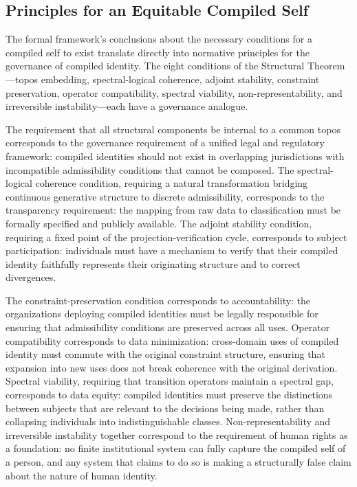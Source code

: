 \documentclass[12pt, a4paper]{article}
\theoremstyle{plain}
\theoremstyle{definition}
\theoremstyle{remark}
\begin{document}
\subsection{Principles for an Equitable Compiled Self}

The formal framework's conclusions about the necessary conditions for a compiled self to exist translate directly into normative principles for the governance of compiled identity. The eight conditions of the Structural Theorem---topos embedding, spectral-logical coherence, adjoint stability, constraint preservation, operator compatibility, spectral viability, non-representability, and irreversible instability---each have a governance analogue.

The requirement that all structural components be internal to a common topos corresponds to the governance requirement of a unified legal and regulatory framework: compiled identities should not exist in overlapping jurisdictions with incompatible admissibility conditions that cannot be composed. The spectral-logical coherence condition, requiring a natural transformation bridging continuous generative structure to discrete admissibility, corresponds to the transparency requirement: the mapping from raw data to classification must be formally specified and publicly available. The adjoint stability condition, requiring a fixed point of the projection-verification cycle, corresponds to subject participation: individuals must have a mechanism to verify that their compiled identity faithfully represents their originating structure and to correct divergences.

The constraint-preservation condition corresponds to accountability: the organizations deploying compiled identities must be legally responsible for ensuring that admissibility conditions are preserved across all uses. Operator compatibility corresponds to data minimization: cross-domain uses of compiled identity must commute with the original constraint structure, ensuring that expansion into new uses does not break coherence with the original derivation. Spectral viability, requiring that transition operators maintain a spectral gap, corresponds to data equity: compiled identities must preserve the distinctions between subjects that are relevant to the decisions being made, rather than collapsing individuals into indistinguishable classes. Non-representability and irreversible instability together correspond to the requirement of human rights as a foundation: no finite institutional system can fully capture the compiled self of a person, and any system that claims to do so is making a structurally false claim about the nature of human identity.
\end{document}
